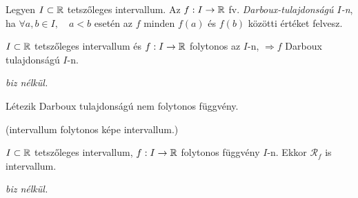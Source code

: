 \documentclass[a4paper,11.5pt]{article}
\begin{document}
	\begin{definition}
		Legyen $I\subset\mathbb{R}$ tetszőleges intervallum. Az $f: I\to\mathbb{R}$ fv. \textit{Darboux-tulajdonságú $I$-n}, ha $\forall a, b \in I, \quad a<b$ esetén az $f$ minden $f(a)$ és $f(b)$ közötti értéket felvesz.
	\end{definition}
	\begin{theorem}
		$I\subset\mathbb{R}$ tetszőleges intervallum és $f:I\to\mathbb{R} $ folytonos az $I$-n, $ \Rightarrow f$ Darboux tulajdonságú $I$-n.
		\medskip
		
		\textit{biz nélkül.}
		\begin{note}
			Létezik Darboux tulajdonságú nem folytonos függvény.
		\end{note}
	\end{theorem}
	\begin{theorem}
		(intervallum folytonos képe intervallum.)
		
		$I\subset \mathbb{R}$ tetszőleges intervallum, $f:I\to\mathbb{R}$ folytonos függvény $I$-n. Ekkor $\mathcal{R}_f$ is intervallum.
		\medskip
		
		\textit{biz nélkül.}
	\end{theorem}
\end{document}
